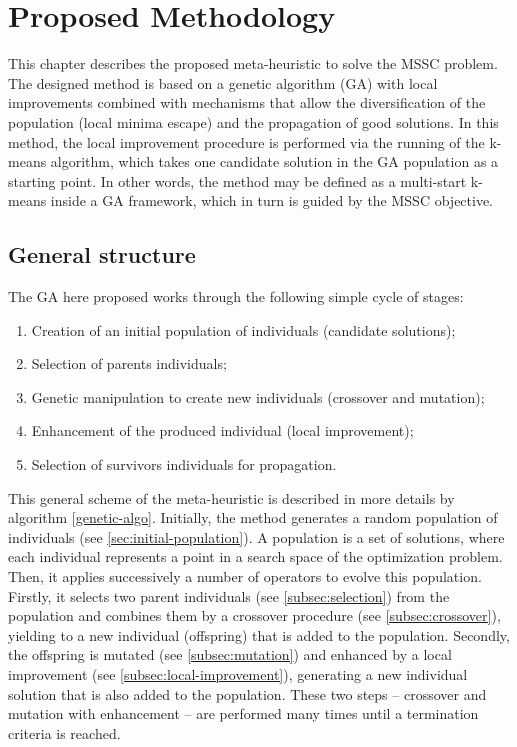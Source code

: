 \chapter{Proposed Methodology}
\label{chap:methodology}
This chapter describes the proposed meta-heuristic to solve the MSSC problem. The designed method is based on a genetic algorithm (GA) with local improvements combined with mechanisms that allow the diversification of the population (local minima escape) and the propagation of good solutions. In this method, the local improvement procedure is performed via the running of the k-means algorithm, which takes one candidate solution in the GA population as a starting point. In other words, the method may be defined as a multi-start k-means inside a GA framework, which in turn is guided by the MSSC objective. 

\section{General structure}
\label{sec:general-structure}
The GA here proposed works through the following simple cycle of stages:

\begin{enumerate}
	\item Creation of an initial population of individuals (candidate solutions);

	\item Selection of parents individuals;

	\item Genetic manipulation to create new individuals (crossover and mutation);
	
	\item Enhancement of the produced individual (local improvement);
	
	\item Selection of survivors individuals for propagation.
	
\end{enumerate}

This general scheme of the meta-heuristic is described in more details by algorithm \ref{genetic-algo}. Initially, the method generates a random population of individuals (see \ref{sec:initial-population}). A population is a set of solutions, where each individual represents a point in a search space of the optimization problem. Then, it applies successively a number of operators to evolve this population. Firstly, it selects two parent individuals (see \ref{subsec:selection}) from the population and combines them by a crossover procedure (see \ref{subsec:crossover}), yielding to a new individual (offspring) that is added to the population. Secondly, the offspring is mutated (see \ref{subsec:mutation}) and enhanced by a local improvement (see \ref{subsec:local-improvement}), generating a new individual solution that is also added to the population. These two steps -- crossover and mutation with enhancement -- are performed many times until a termination criteria is reached.

